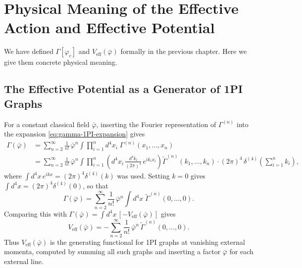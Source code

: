 \chapter{Physical Meaning of the Effective Action and Effective Potential}
\label{ch:physical-meaning}

We have defined $\Gamma[\varphi_c]$ and $V_{\text{eff}}(\bar\varphi)$
formally in the previous chapter. Here we give them concrete physical
meaning.

\section{The Effective Potential as a Generator of 1PI Graphs}

For a constant classical field $\bar{\varphi}$, inserting the Fourier
representation of $\Gamma^{(n)}$ into the expansion
\eqref{eq:gamma-1PI-expansion} gives
\begin{align}
	\Gamma(\bar{\varphi}) & = \sum_{n=2}^{\infty} \frac{1}{n!}\,
	\bar{\varphi}^n \int \prod_{i=1}^{n} d^4x_i\;
	\Gamma^{(n)}(x_1, \ldots, x_n)                                               \\
	                      & = \sum_{n=2}^{\infty} \frac{1}{n!}\, \bar{\varphi}^n
	\int \prod_{i=1}^{n} \left( d^4x_i\, \frac{d^4k_i}{(2\pi)^4}\,
	e^{ik_i x_i} \right) \tilde{\Gamma}^{(n)}(k_1, \ldots, k_n) \cdot
	(2\pi)^4\, \delta^{(4)}\!\left(\sum_{i=1}^{n} k_i\right),
\end{align}
where $\int d^4x\, e^{ikx} = (2\pi)^4\delta^{(4)}(k)$ was used. Setting
$k=0$ gives $\int d^4x = (2\pi)^4\delta^{(4)}(0)$, so that
\begin{equation}
	\Gamma(\bar{\varphi}) = \sum_{n=2}^{\infty} \frac{1}{n!}\,
	\bar{\varphi}^n \int d^4x\; \tilde{\Gamma}^{(n)}(0, \ldots, 0).
\end{equation}
Comparing this with $\Gamma(\bar{\varphi}) =
	\int d^4x\,[-V_{\text{eff}}(\bar{\varphi})]$ gives
\begin{equation}
	V_{\text{eff}}(\bar{\varphi}) = -\sum_{n=2}^{\infty}
	\frac{1}{n!}\,\bar{\varphi}^n\,\tilde{\Gamma}^{(n)}(0, \ldots, 0).
\end{equation}
Thus $V_{\text{eff}}(\bar\varphi)$ is the generating functional for 1PI
graphs at vanishing external momenta, computed by summing all such graphs
and inserting a factor $\bar\varphi$ for each external line.

